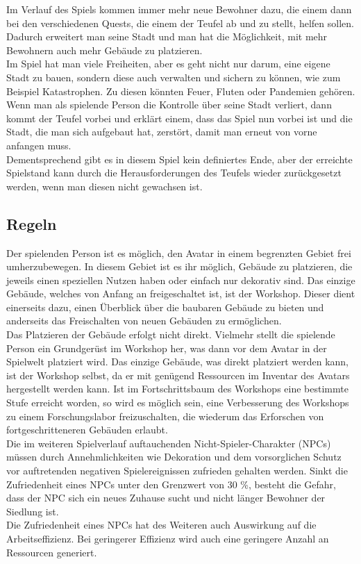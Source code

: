 \documentclass[paper=A4,pagesize=auto,12pt,headinclude=true,footinclude=true,BCOR=0mm,DIV=calc]{scrartcl}
\newcommand{\sectionspace}{
	\vspace{0.5cm}
}
\begin{document}
Im Verlauf des Spiels kommen immer mehr neue Bewohner dazu, die einem dann bei den verschiedenen Quests, die einem der Teufel ab und zu stellt, helfen sollen. Dadurch erweitert man seine Stadt und man hat die Möglichkeit, mit mehr Bewohnern auch mehr Gebäude zu platzieren. \\
Im Spiel hat man viele Freiheiten, aber es geht nicht nur darum, eine eigene Stadt zu bauen, sondern diese auch verwalten und sichern zu können, wie zum Beispiel Katastrophen. Zu diesen könnten Feuer, Fluten oder Pandemien gehören. Wenn man als spielende Person die Kontrolle über seine Stadt verliert, dann kommt der Teufel vorbei und erklärt einem, dass das Spiel nun vorbei ist und die Stadt, die man sich aufgebaut hat, zerstört, damit man erneut von vorne anfangen muss. \\
Dementsprechend gibt es in diesem Spiel kein definiertes Ende, aber der erreichte Spielstand kann durch die Herausforderungen des Teufels wieder zurückgesetzt werden, wenn man diesen nicht gewachsen ist.


\sectionspace
\subsection{Regeln}
Der spielenden Person ist es möglich, den Avatar in einem begrenzten Gebiet frei umherzubewegen. In diesem Gebiet ist es ihr möglich, Gebäude zu platzieren, die jeweils einen speziellen Nutzen haben oder einfach nur dekorativ sind. Das einzige Gebäude, welches von Anfang an freigeschaltet ist, ist der Workshop. Dieser dient einerseits dazu, einen Überblick über die baubaren Gebäude zu bieten und anderseits das Freischalten von neuen Gebäuden zu ermöglichen. \\
Das Platzieren der Gebäude erfolgt nicht direkt. Vielmehr stellt die spielende Person ein Grundgerüst im Workshop her, was dann vor dem Avatar in der Spielwelt platziert wird. Das einzige Gebäude, was direkt platziert werden kann, ist der Workshop selbst, da er mit genügend Ressourcen im Inventar des Avatars hergestellt werden kann.
Ist im Fortschrittsbaum des Workshops eine bestimmte Stufe erreicht worden, so wird es möglich sein, eine Verbesserung des Workshops zu einem Forschungslabor freizuschalten, die wiederum das Erforschen von fortgeschritteneren Gebäuden erlaubt. \\
Die im weiteren Spielverlauf auftauchenden Nicht-Spieler-Charakter (NPCs) müssen durch Annehmlichkeiten wie Dekoration und dem vorsorglichen Schutz vor auftretenden negativen Spielereignissen zufrieden gehalten werden. Sinkt die Zufriedenheit eines NPCs unter den Grenzwert von 30 \%, besteht die Gefahr, dass der NPC sich ein neues Zuhause sucht und nicht länger Bewohner der Siedlung ist. \\ %
Die Zufriedenheit eines NPCs hat des Weiteren auch Auswirkung auf die Arbeitseffizienz. Bei geringerer Effizienz wird auch eine geringere Anzahl an Ressourcen generiert.
\end{document}
